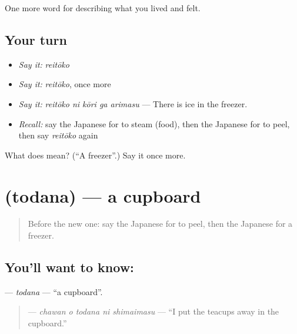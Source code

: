 \begin{grammarlens}[title={What you've built}]
One more word for describing what you lived and felt.
\end{grammarlens}

\subsection*{Your turn}
\begin{itemize}
\raggedright
  \item \emph{Say it:} \emph{reitōko}
  \item \emph{Say it:} \emph{reitōko}, once more
  \item \emph{Say it:} \emph{reitōko ni kōri ga arimasu} — There is ice in the freezer.
  \item \emph{Recall:} say the Japanese for to steam (food), then the Japanese for to peel, then say \emph{reitōko} again
\end{itemize}

\begin{tcolorbox}[breakable,colback=teal!4,colframe=teal!35!black,title={Before you move on}]
What does  mean? (\textquotedblleft{}A freezer\textquotedblright{}.) Say it once more.
\end{tcolorbox}
\section[\texorpdfstring{\ja{とだな} (todana)}{とだな (todana)}]{ (todana) — a cupboard}

\label{lesson:JA-C493-todana}



\begin{quote}
Before the new one: say the Japanese for to peel, then the Japanese for a freezer.
\end{quote}

\subsection*{You'll want to know: }
\textbf{} — \emph{todana} — \textquotedblleft{}a cupboard\textquotedblright{}.

\begin{quote}
\textbf{  } — \emph{chawan o todana ni shimaimasu} — \textquotedblleft{}I put the teacups away in the cupboard.\textquotedblright{}
\end{quote}

